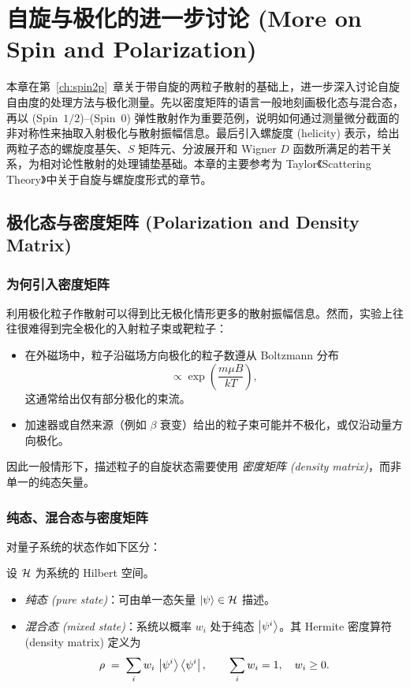 \chapter{自旋与极化的进一步讨论 (More on Spin and Polarization)}\label{ch:morespin}

本章在第~\ref{ch:spin2p}~章关于带自旋的两粒子散射的基础上，进一步深入讨论自旋自由度的处理方法与极化测量。先以密度矩阵的语言一般地刻画极化态与混合态，再以 (Spin~$1/2$)–(Spin~$0$) 弹性散射作为重要范例，说明如何通过测量微分截面的非对称性来抽取入射极化与散射振幅信息。最后引入螺旋度 (helicity) 表示，给出两粒子态的螺旋度基矢、$S$ 矩阵元、分波展开和 Wigner $D$ 函数所满足的若干关系，为相对论性散射的处理铺垫基础。本章的主要参考为 Taylor《Scattering Theory》中关于自旋与螺旋度形式的章节。

\section{极化态与密度矩阵 (Polarization and Density Matrix)}

\subsection{为何引入密度矩阵}

利用极化粒子作散射可以得到比无极化情形更多的散射振幅信息。然而，实验上往往很难得到完全极化的入射粒子束或靶粒子：
\begin{itemize}
  \item 在外磁场中，粒子沿磁场方向极化的粒子数遵从 Boltzmann 分布
  \[
    \propto \exp\!\left(\frac{m\mu B}{kT}\right),
  \]
  这通常给出仅有部分极化的束流。
  \item 加速器或自然来源（例如 $\beta$ 衰变）给出的粒子束可能并不极化，或仅沿动量方向极化。
\end{itemize}
因此一般情形下，描述粒子的自旋状态需要使用 \emph{密度矩阵 (density matrix)}，而非单一的纯态矢量。

\subsection{纯态、混合态与密度矩阵}

对量子系统的状态作如下区分：
\begin{definition}[纯态与混合态]
\label{def:pure-mixed}
设 $\mathcal{H}$ 为系统的 Hilbert 空间。
\begin{itemize}
  \item \emph{纯态 (pure state)}：可由单一态矢量 $\ket{\psi}\in\mathcal{H}$ 描述。
  \item \emph{混合态 (mixed state)}：系统以概率 $w_i$ 处于纯态 $\ket{\psi^i}$。其 Hermite 密度算符 (density matrix) 定义为
  \begin{equation}
    \rho \;=\; \sum_i w_i \,\ket{\psi^i}\bra{\psi^i}, \qquad \sum_i w_i = 1, \quad w_i\geq 0.
    \label{eq:rho-def}
  \end{equation}
\end{itemize}
\end{definition}

